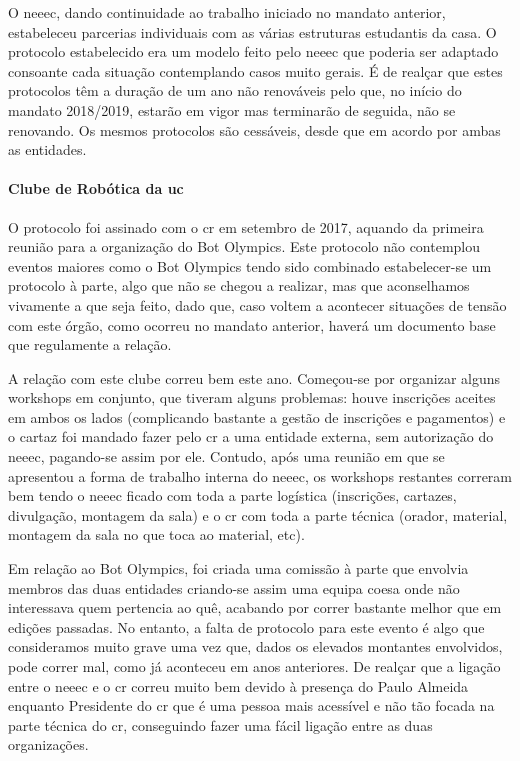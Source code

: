 O \acrshort{neeec}, dando continuidade ao trabalho iniciado no mandato anterior, estabeleceu parcerias individuais com as várias estruturas estudantis da casa. O protocolo estabelecido era um modelo feito pelo \acrshort{neeec} que poderia ser adaptado consoante cada situação contemplando casos muito gerais. É de realçar que estes protocolos têm a duração de um ano não renováveis pelo que, no início do mandato 2018/2019, estarão em vigor mas terminarão de seguida, não se renovando. Os mesmos protocolos são cessáveis, desde que em acordo por ambas as entidades.

\paragraph{Clube de Robótica da \acrlong{uc}}

O protocolo foi assinado com o \acrfull{cr} em setembro de 2017, aquando da primeira reunião para a organização do Bot Olympics. Este protocolo não contemplou eventos maiores como o Bot Olympics tendo sido combinado estabelecer-se um protocolo à parte, algo que não se chegou a realizar, mas que aconselhamos vivamente a que seja feito, dado que, caso voltem a acontecer situações de tensão com este órgão, como ocorreu no mandato anterior, haverá um documento base que regulamente a relação.

A relação com este clube correu bem este ano. Começou-se por organizar alguns workshops em conjunto, que tiveram alguns problemas: houve inscrições aceites em ambos os lados (complicando bastante a gestão de inscrições e pagamentos) e o cartaz foi mandado fazer pelo \acrshort{cr} a uma entidade externa, sem autorização do \acrshort{neeec}, pagando-se assim por ele. Contudo, após uma reunião em que se apresentou a forma de trabalho interna do \acrshort{neeec}, os workshops restantes correram bem tendo o \acrshort{neeec} ficado com toda a parte logística (inscrições, cartazes, divulgação, montagem da sala) e o \acrshort{cr} com toda a parte técnica (orador, material, montagem da sala no que toca ao material, etc).

Em relação ao Bot Olympics, foi criada uma comissão à parte que envolvia membros das duas entidades criando-se assim uma equipa coesa onde não interessava quem pertencia ao quê, acabando por correr bastante melhor que em edições passadas. No entanto, a falta de protocolo para este evento é algo que consideramos muito grave uma vez que, dados os elevados montantes envolvidos, pode correr mal, como já aconteceu em anos anteriores. De realçar que a ligação entre o \acrshort{neeec} e o \acrshort{cr} correu muito bem devido à presença do Paulo Almeida enquanto Presidente do \acrshort{cr} que é uma pessoa mais acessível e não tão focada na parte técnica do \acrshort{cr}, conseguindo fazer uma fácil ligação entre as duas organizações.


